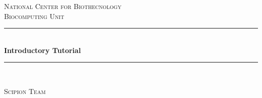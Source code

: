 \documentclass[12pt]{article} %
\begin{document}

\begin{titlepage}

\newcommand{\HRule}{\rule{\linewidth}{0.5mm}} %

\center %

\textsc{\LARGE National Center for Biothecnology}\\[1.5cm] %
\textsc{\Large Biocomputing Unit}\\[0.5cm] %

\HRule \\[0.4cm]
{ \huge \bfseries Introductory Tutorial}\\[0.4cm] %
\HRule \\[1.5cm]





\vfill %
\begin{flushright}
 \large
  \textsc{Scipion Team} %
\end{flushright}

\end{titlepage}
\end{document}
